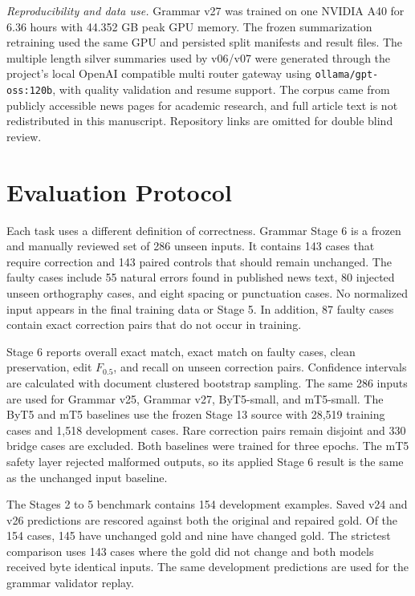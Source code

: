 \documentclass[a4paper,conference]{IEEEtran}
\begin{document}
\textit{Reproducibility and data use.} Grammar v27 was trained on one NVIDIA
A40 for 6.36 hours with 44.352 GB peak GPU memory. The frozen summarization
retraining used the same GPU and persisted split manifests and result files.
The multiple length silver summaries used by v06/v07 were generated through the
project's local OpenAI compatible multi router gateway using
\texttt{ollama/gpt-oss:120b}, with quality validation and resume support. The
corpus came from publicly accessible news pages for academic research, and full
article text is not redistributed in this manuscript. Repository links are
omitted for double blind review.

\section{Evaluation Protocol}
Each task uses a different definition of correctness. Grammar Stage 6 is a
frozen and manually reviewed set of 286 unseen inputs. It contains 143 cases
that require correction and 143 paired controls that should remain unchanged.
The faulty cases include 55 natural errors found in published news text, 80
injected unseen orthography cases, and eight spacing or punctuation cases. No
normalized input appears in the final training data or Stage 5. In addition,
87 faulty cases contain exact correction pairs that do not occur in training.

Stage 6 reports overall exact match, exact match on faulty cases, clean
preservation, edit $F_{0.5}$, and recall on unseen correction pairs. Confidence
intervals are calculated with document clustered bootstrap sampling. The same
286 inputs are used for Grammar v25, Grammar v27, ByT5-small, and mT5-small.
The ByT5 and mT5 baselines use the frozen Stage 13 source with 28,519 training
cases and 1,518 development cases. Rare correction pairs remain disjoint and
330 bridge cases are excluded. Both baselines were trained for three epochs.
The mT5 safety layer rejected malformed outputs, so its applied Stage 6 result
is the same as the unchanged input baseline.

The Stages 2 to 5 benchmark contains 154 development examples. Saved v24 and
v26 predictions are rescored against both the original and repaired gold. Of
the 154 cases, 145 have unchanged gold and nine have changed gold. The
strictest comparison uses 143 cases where the gold did not change and both
models received byte identical inputs. The same development predictions are
used for the grammar validator replay.
\end{document}
